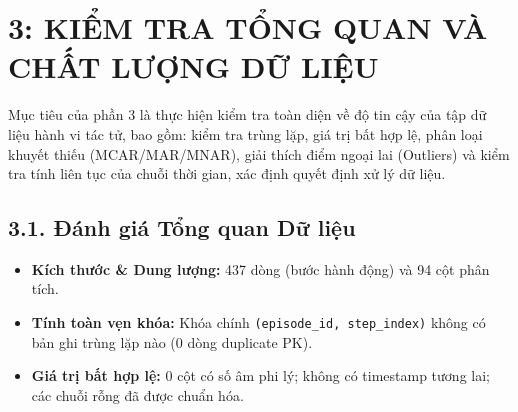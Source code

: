 \documentclass[11pt]{article}
\providecommand{\tightlist}{%
      \setlength{\itemsep}{0pt}\setlength{\parskip}{0pt}}
\begin{document}
    \section{3: KIỂM TRA TỔNG QUAN VÀ CHẤT LƯỢNG DỮ
LIỆU}\label{kiux1ec3m-tra-tux1ed5ng-quan-vuxe0-chux1ea5t-lux1b0ux1ee3ng-dux1eef-liux1ec7u}

Mục tiêu của phần 3 là thực hiện kiểm tra toàn diện về độ tin cậy của
tập dữ liệu hành vi tác tử, bao gồm: kiểm tra trùng lặp, giá trị bất hợp
lệ, phân loại khuyết thiếu (MCAR/MAR/MNAR), giải thích điểm ngoại lai
(Outliers) và kiểm tra tính liên tục của chuỗi thời gian, xác định quyết
định xử lý dữ liệu.

\subsection{3.1. Đánh giá Tổng quan Dữ
liệu}\label{ux111uxe1nh-giuxe1-tux1ed5ng-quan-dux1eef-liux1ec7u}

\begin{itemize}
\tightlist
\item
  \textbf{Kích thước \& Dung lượng:} 437 dòng (bước hành động) và 94 cột
  phân tích.
\item
  \textbf{Tính toàn vẹn khóa:} Khóa chính
  \texttt{(episode\_id,\ step\_index)} không có bản ghi trùng lặp nào (0
  dòng duplicate PK).
\item
  \textbf{Giá trị bất hợp lệ:} 0 cột có số âm phi lý; không có timestamp
  tương lai; các chuỗi rỗng đã được chuẩn hóa.
\end{itemize}
\end{document}
